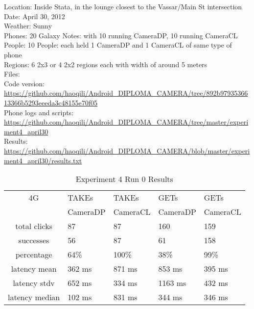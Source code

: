 Location: Inside Stata, in the lounge closest to the Vassar/Main St intersection\\
Date: April 30, 2012\\
Weather: Sunny\\
Phones: 20 Galaxy Notes: with 10 running CameraDP, 10 running CameraCL\\
People: 10 People: each held 1 CameraDP and 1 CameraCL of same type of phone\\
Regions: 6 2x3 or 4 2x2 regions each with width of around 5 meters\\
Files:\\
Code version: {\url{https://github.com/haoqili/Android_DIPLOMA_CAMERA/tree/892b9793536613366b5293eeeda3c48155e70f05}}\\
Phone logs and scripts: {\url{https://github.com/haoqili/Android_DIPLOMA_CAMERA/tree/master/experiment4_april30}}\\ 
Results: {\url{https://github.com/haoqili/Android_DIPLOMA_CAMERA/blob/master/experiment4_april30/results.txt}}\\

\begin{table}[htb]
\begin{scriptsize} 
\caption{Experiment 4 Run 0 Results} 
\label{table:exp-4-run0-results}
 \begin{center}
 \begin{tabular}{| c | p{1.5cm} | p{1.5cm} | p{1.5cm} | p{1.4cm} |}
  \hline
  4G & TAKEs & TAKEs & GETs & GETs \\
  & CameraDP & CameraCL & CameraDP & CameraCL \\
  \hline
  total clicks & 87 & 87 & 160 & 159 \\
  \hline
  successes & 56 & 87 & 61 & 158 \\
  \hline
  percentage & 64\% & 100\% & 38\% & 99\% \\
  \hline
  latency mean & 362 ms & 871 ms & 853 ms & 395 ms \\
  \hline
  latency stdv & 652 ms &334 ms &1163 ms & 432 ms \\
  \hline
  latency median & 102 ms & 831 ms & 344 ms & 346 ms \\
  \hline
  \end{tabular}

  \end{center}
\end{scriptsize}
\end{table}

